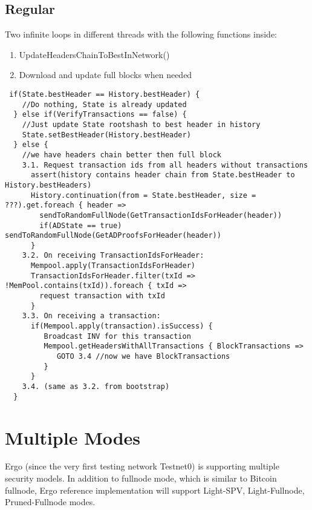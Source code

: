 \documentclass[]{report}   %
\begin{document}
\subsection{Regular}
Two infinite loops in different threads with the following functions inside:
\begin{enumerate}
\item UpdateHeadersChainToBestInNetwork()
\item Download and update full blocks when needed
\end{enumerate}
\begin{verbatim}
 if(State.bestHeader == History.bestHeader) {
    //Do nothing, State is already updated
  } else if(VerifyTransactions == false) {
    //Just update State rootshash to best header in history
    State.setBestHeader(History.bestHeader)
  } else {
    //we have headers chain better then full block         
    3.1. Request transaction ids from all headers without transactions
      assert(history contains header chain from State.bestHeader to History.bestHeaders)
      History.continuation(from = State.bestHeader, size = ???).get.foreach { header => 
        sendToRandomFullNode(GetTransactionIdsForHeader(header))
        if(ADState == true) sendToRandomFullNode(GetADProofsForHeader(header))
      }
    3.2. On receiving TransactionIdsForHeader:
      Mempool.apply(TransactionIdsForHeader)
      TransactionIdsForHeader.filter(txId => !MemPool.contains(txId)).foreach { txId => 
        request transaction with txId
      }
    3.3. On receiving a transaction:
      if(Mempool.apply(transaction).isSuccess) {
         Broadcast INV for this transaction
         Mempool.getHeadersWithAllTransactions { BlockTransactions =>
            GOTO 3.4 //now we have BlockTransactions
         }
      }
    3.4. (same as 3.2. from bootstrap)
  }
\end{verbatim}

\section{Multiple Modes}
\label{sec:modes}

Ergo (since the very first testing network Testnet0) is supporting  
multiple security models. In addition to fullnode mode, which is
similar to Bitcoin fullnode, Ergo reference implementation will 
support Light-SPV, Light-Fullnode, Pruned-Fullnode modes.
  
\end{document}
